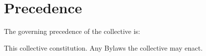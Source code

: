 \chapter{Precedence}\label{sec:precedence}
The governing precedence of the collective is:
\begin{compactenum}[1.]
\itemnotoc This collective constitution.
\itemnotoc Any Bylaws the collective may enact.
\end{compactenum}
